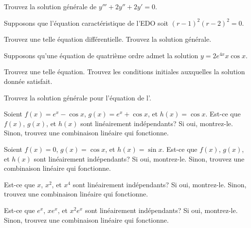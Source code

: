 \begin{exercise}
Trouvez la solution générale de $y''' + 2 y'' + 2 y' = 0$.
\end{exercise}

\begin{exercise}
Supposons que l'équation caractéristique de l'EDO soit  
${(r-1)}^2{(r-2)}^2 = 0$.
\begin{tasks}
\task
Trouvez une telle équation différentielle. 
\task
Trouvez la solution générale.
\end{tasks}
\end{exercise}

\begin{exercise} \label{hol:eqfromsolex}
Supposons qu'une équation de quatrième ordre admet la solution 
$y = 2 e^{4x} x \cos x$.  
\begin{tasks}
\task
Trouvez une telle équation.
\task
Trouvez les conditions initiales auxquelles la solution donnée satisfait. 
\end{tasks}
\end{exercise}

\begin{exercise}
Trouvez la solution générale pour l'équation de l'.
\end{exercise}

\begin{exercise}
Soient
$f(x) = e^x - \cos x$, $g(x) = e^x + \cos x$, et $h(x) = \cos x$.
Est-ce que $f(x)$, $g(x)$, et $h(x)$
sont linéairement indépendants?  Si oui, montrez-le. Sinon, trouvez une combinaison linéaire qui fonctionne. 
\end{exercise}

\begin{exercise}
Soient
$f(x) = 0$, $g(x) = \cos x$, et $h(x) = \sin x$.
Est-ce que  $f(x)$, $g(x)$, et $h(x)$
sont linéairement indépendants?  Si oui, montrez-le. Sinon, trouvez une combinaison linéaire qui fonctionne. 
\end{exercise}

\begin{exercise}
Est-ce que   $x$, $x^2$, et $x^4$
sont linéairement indépendants?  Si oui, montrez-le. Sinon, trouvez une combinaison linéaire qui fonctionne. 
\end{exercise}

\begin{exercise}
Est-ce que $e^x$, $xe^x$, et $x^2e^x$
sont linéairement indépendants?  Si oui, montrez-le. Sinon, trouvez une combinaison linéaire qui fonctionne. 
\end{exercise}

